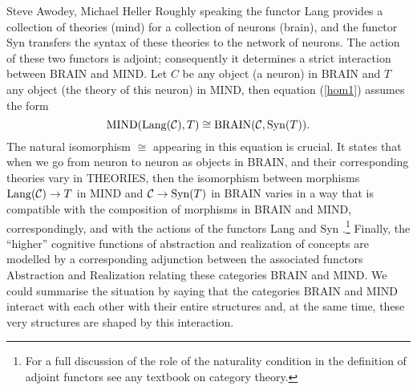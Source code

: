 \begin{artengenv2auth}{Steve Awodey, Michael Heller}
Roughly speaking the functor Lang provides a collection of theories (mind) for a collection of neurons (brain), and the functor Syn transfers the syntax of these theories to the network of neurons. The action of these two functors is adjoint; consequently it determines a strict interaction between BRAIN and MIND. Let $C$ be any object (a neuron) in BRAIN and $T$ any object (the theory of this neuron) in MIND, then equation (\ref{hom1}) assumes the form
\begin{equation}
\label{hom2}
\mathrm{MIND}(\mathrm{Lang}(\CC ), T) \cong {\mathrm{BRAIN}}(\CC , \mathrm{Syn}(T)).
 \end{equation}
The natural isomorphism $\cong $ appearing in this equation is crucial. It states that when we go from neuron to neuron as objects in BRAIN, and their corresponding theories vary in THEORIES, then the isomorphism between morphisms $\mathrm{Lang}(\mbox{${\mathcal{C} }$} ) \to T$ in MIND and $\mbox{${\mathcal{C} }$} \to \mathrm{Syn}(T)$ in BRAIN varies in a way that is compatible with the composition of morphisms in BRAIN and MIND, correspondingly, and with the actions of the functors Lang and Syn \parencites[see][]{AF}[][]{Leinster}.\footnote{For a full discussion of the role of the naturality condition in the definition of adjoint functors see any textbook on category theory.} 
%
Finally, the ``higher'' cognitive functions of abstraction and realization of concepts are modelled by a corresponding adjunction between the associated functors $\mathrm{Abstraction}$ and $\mathrm{Realization}$ relating these categories BRAIN and MIND. 
%
We could summarise the situation by saying that the categories BRAIN and MIND interact with each other with their entire structures and, at the same time, these very structures are shaped by this interaction.


\end{artengenv2auth}
